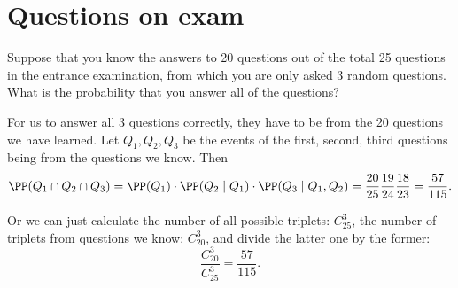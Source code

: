 \section{Questions on exam}
\begin{problem} %
Suppose that you know the answers to 20 questions out of the total 25
questions in the entrance examination, from which you are only asked
3 random questions. What is the probability that you answer all of
the questions?
\end{problem}
\bigskip
\begin{solution}
For us to answer all 3 questions correctly, they have to be from the 20 questions we have learned. Let $Q_1, Q_2, Q_3$ be the events of the first, second, third questions being from the questions we know. Then
\[\PP(Q_1 \cap Q_2 \cap Q_3) = \PP(Q_1)\cdot \PP(Q_2\mid Q_1)\cdot \PP(Q_3 \mid Q_1, Q_2) = \dfrac{20}{25}\dfrac{19}{24}\dfrac{18}{23} = \dfrac{57}{115}. \]

Or we can just calculate the number of all possible triplets: $C_{25}^{3}$, the number of triplets from questions we know: $C_{20}^{3}$, and divide the latter one by the former:
\[
\dfrac{C_{20}^{3}}{C_{25}^{3}} = \dfrac{57}{115}.
\]
\end{solution}

